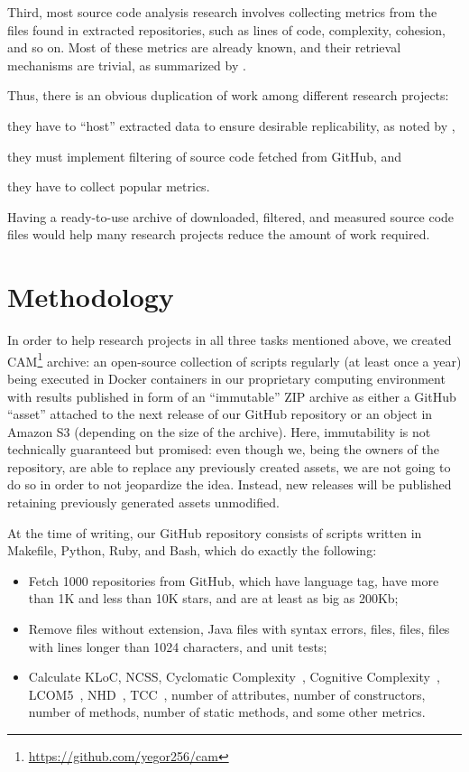 \documentclass[11pt,sigplan,nonacm]{acmart}
\newcommand\cam{{\sffamily CAM}}
\begin{document}
Third, most source code analysis research involves collecting metrics from the files found in extracted repositories, such as lines of code, complexity, cohesion, and so on. Most of these metrics are already known, and their retrieval mechanisms are trivial, as summarized by \citet{nunez2017source}.

Thus, there is an obvious duplication of work among different research projects:
\begin{inparaenum}[(a)]
\item they have to ``host'' extracted data to ensure desirable replicability, as noted by \citet{7887704},
\item they must implement filtering of source code fetched from GitHub, and
\item they have to collect popular metrics.
\end{inparaenum}
Having a ready-to-use archive of downloaded, filtered, and measured source code files would help many research projects reduce the amount of work required.

\section{Methodology}

In order to help research projects in all three tasks mentioned above, we created \cam{}\footnote{\url{https://github.com/yegor256/cam}} archive: an open-source collection of scripts regularly (at least once a year) being executed in Docker containers in our proprietary computing environment with results published in form of an ``immutable'' ZIP archive as either a GitHub ``asset'' attached to the next release of our GitHub repository or an object in Amazon S3 (depending on the size of the archive). Here, immutability is not technically guaranteed but promised: even though we, being the owners of the repository, are able to replace any previously created assets, we are not going to do so in order to not jeopardize the idea. Instead, new releases will be published retaining previously generated assets unmodified.

At the time of writing, our GitHub repository consists of scripts written in Makefile, Python, Ruby, and Bash, which do exactly the following:
\begin{itemize}
    \item Fetch 1000 repositories from GitHub, which have  language tag, have more than 1K and less than 10K stars, and are at least as big as 200Kb;
    \item Remove files without  extension, Java files with syntax errors,  files,  files, files with lines longer than 1024 characters, and unit tests;
    \item Calculate KLoC, NCSS, Cyclomatic Complexity~\citep{mccabe1976complexity}, Cognitive Complexity~\citep{campbell2018cognitive}, LCOM5~\citep{henderson1996coupling}, NHD~\citep{counsell2006interpretation}, TCC~\citep{bieman1995cohesion}, number of attributes, number of constructors, number of methods, number of static methods, and some other metrics.
\end{itemize}
\end{document}
